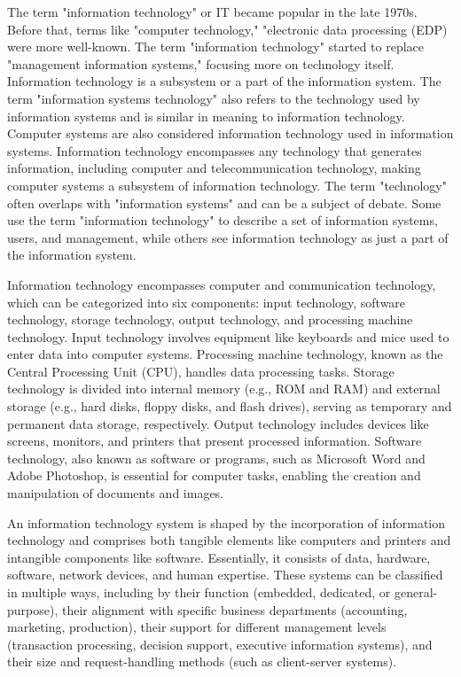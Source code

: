 \documentclass[12pt,titlepage]{article}
\begin{document}
The term "information technology" or IT became popular in the late 1970s. Before that, terms like "computer technology," "electronic data processing (EDP) were more well-known. The term "information technology" started to replace "management information systems," focusing more on technology itself. Information technology is a subsystem or a part of the information system. The term "information systems technology" also refers to the technology used by information systems and is similar in meaning to information technology. Computer systems are also considered information technology used in information systems. Information technology encompasses any technology that generates information, including computer and telecommunication technology, making computer systems a subsystem of information technology. The term "technology" often overlaps with "information systems" and can be a subject of debate. Some use the term "information technology" to describe a set of information systems, users, and management, while others see information technology as just a part of the information system.

Information technology encompasses computer and communication technology, which can be categorized into six components: input technology, software technology, storage technology, output technology, and processing machine technology. Input technology involves equipment like keyboards and mice used to enter data into computer systems. Processing machine technology, known as the Central Processing Unit (CPU), handles data processing tasks. Storage technology is divided into internal memory (e.g., ROM and RAM) and external storage (e.g., hard disks, floppy disks, and flash drives), serving as temporary and permanent data storage, respectively. Output technology includes devices like screens, monitors, and printers that present processed information. Software technology, also known as software or programs, such as Microsoft Word and Adobe Photoshop, is essential for computer tasks, enabling the creation and manipulation of documents and images.

An information technology system is shaped by the incorporation of information technology and comprises both tangible elements like computers and printers and intangible components like software. Essentially, it consists of data, hardware, software, network devices, and human expertise. These systems can be classified in multiple ways, including by their function (embedded, dedicated, or general-purpose), their alignment with specific business departments (accounting, marketing, production), their support for different management levels (transaction processing, decision support, executive information systems), and their size and request-handling methods (such as client-server systems).
\end{document}
